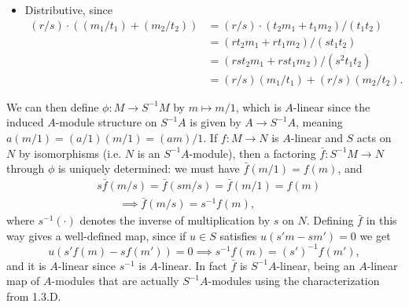 \documentclass{report}
\newcommand{\induced}[1]{\bar{#1}} %
\begin{document}
\begin{enumerate}[label=\textbf{1.3.\Alph*.}]
\begin{itemize}
		      \item Distributive, since
		            \begin{align*}
			            (r/s)\cdot((m_1/t_1)+(m_2/t_2))
			             & = (r/s)\cdot(t_2m_1+t_1m_2)/(t_1t_2) \\
			             & = (rt_2m_1+rt_1m_2)/(st_1t_2)        \\
			             & = (rst_2m_1+rst_1m_2)/(s^2t_1t_2)    \\
			             & = (r/s)(m_1/t_1) + (r/s)(m_2/t_2).
		            \end{align*}
	      \end{itemize}
	      We can then define $\phi:M\to S^{-1}M$ by $m\mapsto m/1$, which is
	      $A$-linear since the induced $A$-module structure on $S^{-1}A$ is
	      given by $A\to S^{-1}A$, meaning $a(m/1)=(a/1)(m/1)=(am)/1$. If
	      $f:M\to N$ is $A$-linear and $S$ acts on $N$ by isomorphisms (i.e.
	      $N$ is an $S^{-1}A$-module), then a factoring $\induced{f}:S^{-1}M\to N$
	      through $\phi$ is uniquely determined: we must have
	      $\induced{f}(m/1)=f(m)$, and
	      \begin{align*}
		       & s\induced{f}(m/s) = \induced{f}(sm/s) = \induced{f}(m/1) = f(m) \\
		       & \qquad\implies \induced{f}(m/s) = s^{-1}f(m),
	      \end{align*}
	      where $s^{-1}(\cdot)$ denotes the inverse of multiplication by $s$
	      on $N$. Defining $\induced{f}$ in this way gives a well-defined map,
	      since if $u\in S$ satisfies $u(s'm-sm')=0$ we get
	      \begin{equation*}
		      u(s'f(m)-sf(m')) = 0 \implies s^{-1}f(m) = (s')^{-1}f(m'),
	      \end{equation*}
	      and it is $A$-linear since $s^{-1}$ is $A$-linear. In fact $\induced{f}$
	      is $S^{-1}A$-linear, being an $A$-linear map of $A$-modules that are
	      actually $S^{-1}A$-modules using the characterization from 1.3.D.


\end{enumerate}
\end{document}
